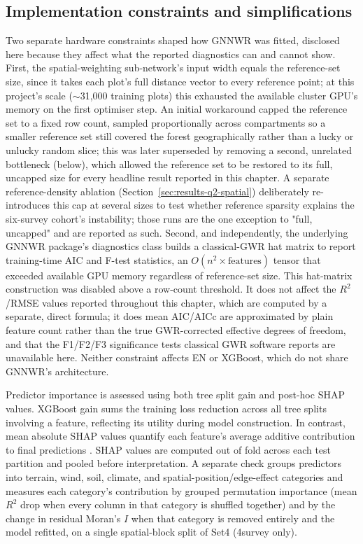 \documentclass[logo,msc,ai]{infthesis}           %
\begin{document}
\subsection*{Implementation constraints and simplifications}
Two separate hardware constraints shaped how GNNWR was fitted, disclosed here because they affect what the reported diagnostics can and cannot show. First, the spatial-weighting sub-network's input width equals the reference-set size, since it takes each plot's full distance vector to every reference point; at this project's scale ($\sim$31,000 training plots) this exhausted the available cluster GPU's memory on the first optimiser step. An initial workaround capped the reference set to a fixed row count, sampled proportionally across compartments so a smaller reference set still covered the forest geographically rather than a lucky or unlucky random slice; this was later superseded by removing a second, unrelated bottleneck (below), which allowed the reference set to be restored to its full, uncapped size for every headline result reported in this chapter. A separate reference-density ablation (Section~\ref{sec:results-q2-spatial}) deliberately re-introduces this cap at several sizes to test whether reference sparsity explains the six-survey cohort's instability; those runs are the one exception to "full, uncapped" and are reported as such. Second, and independently, the underlying GNNWR package's diagnostics class builds a classical-GWR hat matrix to report training-time AIC and F-test statistics, an $O(n^2 \times \text{features})$ tensor that exceeded available GPU memory regardless of reference-set size. This hat-matrix construction was disabled above a row-count threshold. It does not affect the $R^2$/RMSE values reported throughout this chapter, which are computed by a separate, direct formula; it does mean AIC/AICc are approximated by plain feature count rather than the true GWR-corrected effective degrees of freedom, and that the F1/F2/F3 significance tests classical GWR software reports are unavailable here. Neither constraint affects EN or XGBoost, which do not share GNNWR's architecture.

Predictor importance is assessed using both tree split gain and post-hoc SHAP values. XGBoost gain sums the training loss reduction across all tree splits involving a feature, reflecting its utility during model construction. In contrast, mean absolute SHAP values quantify each feature's average additive contribution to final predictions \cite{lundberg2017unified}. SHAP values are computed out of fold across each test partition and pooled before interpretation. A separate check groups predictors into terrain, wind, soil, climate, and spatial-position/edge-effect categories and measures each category's contribution by grouped permutation importance (mean $R^2$ drop when every column in that category is shuffled together) and by the change in residual Moran's $I$ when that category is removed entirely and the model refitted, on a single spatial-block split of Set4 (4survey only).
\end{document}

